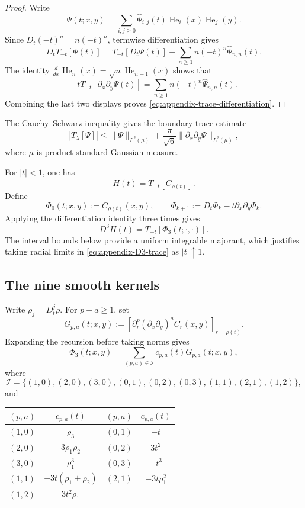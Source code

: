 \begin{proof}
Write
\[
  \Psi(t;x,y)=\sum_{i,j\ge0}\widehat\Psi_{i,j}(t)
  \operatorname{He}_i(x)\operatorname{He}_j(y).
\]
Since $D_t(-t)^n=n(-t)^n$, termwise differentiation gives
\[
  D_tT_{-t}[\Psi(t)]
  =T_{-t}[D_t\Psi(t)]
   +\sum_{n\ge1}n(-t)^n\widehat\Psi_{n,n}(t).
\]
The identity
$\frac{d}{dx}\operatorname{He}_n(x)=\sqrt n\operatorname{He}_{n-1}(x)$
shows that
\[
  -tT_{-t}[\partial_x\partial_y\Psi(t)]
  =\sum_{n\ge1}n(-t)^n\widehat\Psi_{n,n}(t).
\]
Combining the last two displays proves
\eqref{eq:appendix-trace-differentiation}.
\end{proof}

The Cauchy--Schwarz inequality gives the boundary trace estimate
\begin{equation}
  |T_\lambda[\Psi]|
  \le
  \|\Psi\|_{L^2(\mu)}
  +\frac{\pi}{\sqrt6}
  \|\partial_x\partial_y\Psi\|_{L^2(\mu)},
  \label{eq:appendix-trace-bound}
\end{equation}
where $\mu$ is product standard Gaussian measure.

For $|t|<1$, one has
\[
  H(t)=T_{-t}[C_{\rho(t)}].
\]
Define
\[
  \Phi_0(t;x,y):=C_{\rho(t)}(x,y),
  \qquad
  \Phi_{k+1}:=D_t\Phi_k-t\partial_x\partial_y\Phi_k.
\]
Applying the differentiation identity three times gives
\begin{equation}
  D^3H(t)=T_{-t}[\Phi_3(t;\cdot,\cdot)].
  \label{eq:appendix-D3-trace}
\end{equation}
The interval bounds below provide a uniform integrable majorant, which
justifies taking radial limits in \eqref{eq:appendix-D3-trace} as
$|t|\uparrow1$.

\subsection{The nine smooth kernels}
\label{app:certification-nine-kernels}

Write $\rho_j=D_t^j\rho$.  For $p+a\ge1$, set
\[
  G_{p,a}(t;x,y)
  :=\left[
  \partial_r^p(\partial_x\partial_y)^aC_r(x,y)
  \right]_{r=\rho(t)}.
\]
Expanding the recursion before taking norms gives
\[
  \Phi_3(t;x,y)
  =\sum_{(p,a)\in\mathcal I}c_{p,a}(t)G_{p,a}(t;x,y),
\]
where
\[
  \mathcal I=
  \{(1,0),(2,0),(3,0),(0,1),(0,2),(0,3),
    (1,1),(2,1),(1,2)\},
\]
and
\begin{center}
\begin{tabular}{c c@{\qquad}c c}
\toprule
$(p,a)$ & $c_{p,a}(t)$ & $(p,a)$ & $c_{p,a}(t)$\\
\midrule
$(1,0)$ & $\rho_3$ & $(0,1)$ & $-t$\\
$(2,0)$ & $3\rho_1\rho_2$ & $(0,2)$ & $3t^2$\\
$(3,0)$ & $\rho_1^3$ & $(0,3)$ & $-t^3$\\
$(1,1)$ & $-3t(\rho_1+\rho_2)$ & $(2,1)$ & $-3t\rho_1^2$\\
$(1,2)$ & $3t^2\rho_1$ & & \\
\bottomrule
\end{tabular}
\end{center}

